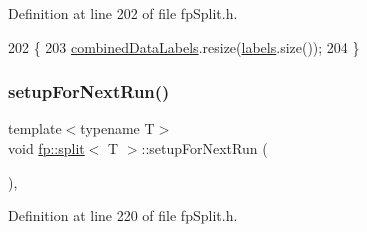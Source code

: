 Definition at line 202 of file fp\+Split.\+h.


\begin{DoxyCode}
202                                                 \{
203                     \hyperlink{classfp_1_1split_ac8f54cf4a42335814e10e351c49e3c32}{combinedDataLabels}.resize(\hyperlink{classfp_1_1split_a9658b163c2cd30e9900e21c3b1c3f2f9}{labels}.size());
204                 \}
\end{DoxyCode}
\mbox{\label{classfp_1_1split_a5ccfceb36e8ea567816af95bb4ae4fea}} 
\subsubsection{\texorpdfstring{setup\+For\+Next\+Run()}{setupForNextRun()}}
{\footnotesize\ttfamily template$<$typename T$>$ \\
void \hyperlink{classfp_1_1split}{fp\+::split}$<$ T $>$\+::setup\+For\+Next\+Run (\begin{DoxyParamCaption}{ }\end{DoxyParamCaption})\hspace{0.3cm}{\ttfamily [inline]}, {\ttfamily [protected]}}



Definition at line 220 of file fp\+Split.\+h.


